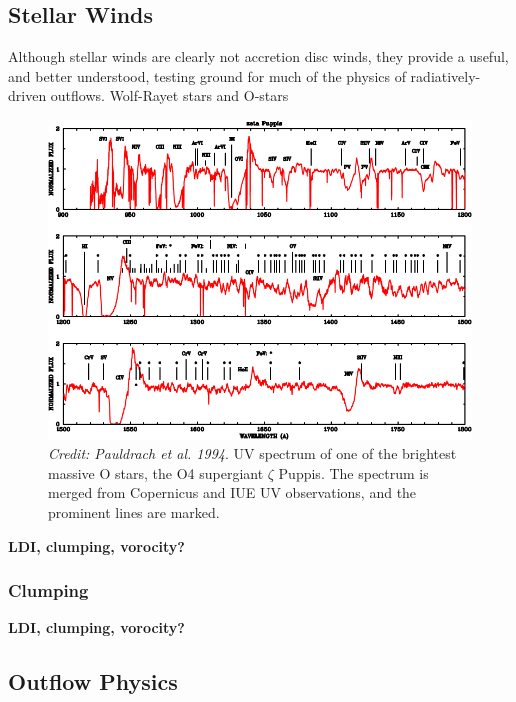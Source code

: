 \subsection{Stellar Winds}

\label{sec:stellar_winds}

Although stellar winds are clearly not accretion disc winds,
they provide a useful, and better understood, testing ground for much
of the physics of radiatively-driven outflows. 
Wolf-Rayet stars and O-stars

\nocite{pauldrach1994}
\begin{figure}
\centering
\includegraphics[width=1.0\textwidth]{figures/02-outflows/hot_star_wind.png}
\caption
{
{\sl Credit: Pauldrach et al. 1994}. 
UV spectrum of one of the brightest massive O stars, 
the O4 supergiant $\zeta$ Puppis. The spectrum is merged from 
Copernicus and IUE UV observations, and the prominent lines are 
marked.
} 
\label{fig:hot_star_wind}
\end{figure}


{\bf LDI, clumping, vorocity?} 

\subsubsection{Clumping}

{\bf LDI, clumping, vorocity?}

\subsection{Outflow Physics}

